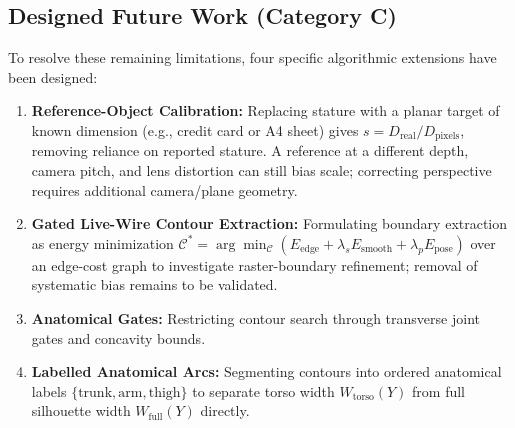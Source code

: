 \documentclass[journal]{IEEEtran}
\begin{document}
\subsection{Designed Future Work (Category C)}
To resolve these remaining limitations, four specific algorithmic extensions have been designed:
\begin{enumerate}
    \item \textbf{Reference-Object Calibration:} Replacing stature with a planar target of known dimension (e.g., credit card or A4 sheet) gives $s = D_{\text{real}} / D_{\text{pixels}}$, removing reliance on reported stature. A reference at a different depth, camera pitch, and lens distortion can still bias scale; correcting perspective requires additional camera/plane geometry.
    \item \textbf{Gated Live-Wire Contour Extraction:} Formulating boundary extraction as energy minimization $\mathcal{C}^* = \arg\min_{\mathcal{C}} (E_{\text{edge}} + \lambda_s E_{\text{smooth}} + \lambda_p E_{\text{pose}})$ over an edge-cost graph to investigate raster-boundary refinement; removal of systematic bias remains to be validated.
    \item \textbf{Anatomical Gates:} Restricting contour search through transverse joint gates and concavity bounds.
    \item \textbf{Labelled Anatomical Arcs:} Segmenting contours into ordered anatomical labels $\{ \text{trunk}, \text{arm}, \text{thigh} \}$ to separate torso width $W_{\text{torso}}(Y)$ from full silhouette width $W_{\text{full}}(Y)$ directly.
\end{enumerate}

\end{document}
